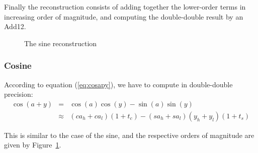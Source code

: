 Finally the reconstruction consists of adding together the lower-order
terms in increasing order of magnitude, and computing the
double-double result by an Add12.

\begin{figure}[htbp]    
  \begin{center}
    \small
    \setlength{\unitlength}{3ex}
   \end{center}
   \caption{The sine reconstruction}
   \label{fig:sine-reconstruction}
 \end{figure}
 
 

\subsubsection{Cosine}
According to equation (\ref{eq:cosapy}), we have to compute in double-double precision:
 \begin{eqnarray*}
  \cos(a+y) &=& \cos(a) \cos(y)  - \sin(a)\sin(y)  \\
  & \approx& (ca_h+ca_l)(1+t_c) - (sa_h+sa_l)(y_h+y_l)(1+t_s)
\end{eqnarray*}

This is similar to the case of the sine, and the respective orders of
magnitude are given by Figure~\ref{fig:sine-reconstruction}.

